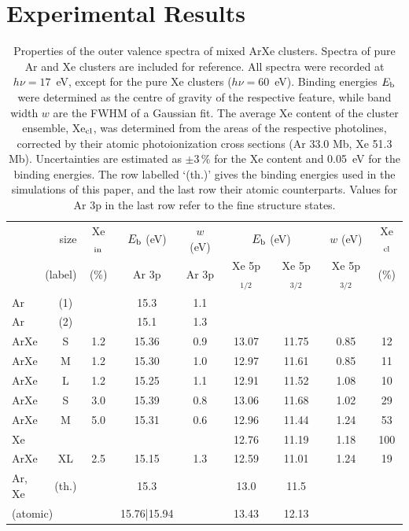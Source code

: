 \documentclass[journal=jpccck,manuscript=article]{achemso}
\def\EB{E_{\rm b}}
\begin{document}
\clearpage
\section{Experimental Results}
\label{sec:exp_results}
%
%
\begin{table}
\caption{Properties of the outer valence spectra of mixed ArXe clusters. 
Spectra of pure Ar and Xe clusters are included for reference. 
All spectra were recorded at $h\nu = 17$~eV, except for the pure Xe clusters ($h\nu = 60$~eV). 
Binding energies $\EB$ were determined as the centre of gravity of the respective feature, while band width $w$ are the FWHM of a Gaussian fit. 
The average Xe content of the cluster ensemble, Xe$_{\rm cl}$, was determined from the areas of the respective photolines, corrected by their atomic photoionization cross sections (Ar 33.0 Mb, Xe 51.3 Mb)\cite{samson2002}.
Uncertainties are estimated as $\pm$3\,\% for the Xe content and 0.05~eV for the binding energies. 
The row labelled `(th.)' gives the binding energies used in the simulations of this paper, and the last row their atomic counterparts. 
Values for Ar 3p in the last row refer to the fine structure states.
\label{tab:valence}}
\begin{tabular}{ l c c c c c c c c}
%
\toprule
 \multicolumn{2}{r}{size} &  Xe$_{\rm in}$& $\EB$ (eV)& $w$ (eV)& \multicolumn{2}{c}{$\EB$ (eV)}  & $w$ (eV) &  Xe$_{\rm cl}$ \\
%
 \multicolumn{2}{r}{(label)}&  (\%) & Ar 3p & Ar 3p & Xe 5p$_{1/2}$ &  Xe 5p$_{3/2}$ & Xe 5p$_{3/2}$  &  (\%) \\
\midrule
 Ar & (1) &&  15.3  &  1.1 & & & &  \\
 Ar & (2) &&  15.1  &  1.3 & & & &  \\
%
 ArXe & S &1.2 & 15.36 & 0.9 & 13.07 & 11.75 & 0.85 & 12\\
 ArXe & M &1.2 & 15.30 & 1.0 & 12.97 & 11.61 & 0.85 & 11\\
 ArXe & L &1.2 & 15.25 & 1.1 & 12.91 & 11.52 & 1.08 & 10\\
 ArXe & S &3.0 & 15.39 & 0.8 & 13.06 & 11.68 & 1.02 & 29\\
 ArXe & M &5.0 & 15.31 & 0.6 & 12.96 & 11.44 & 1.24 & 53\\
 Xe &  & & & & 12.76 & 11.19 & 1.18 & 100\\
%
\midrule
%
 ArXe & XL &2.5 & 15.15 & 1.3 & 12.59 & 11.01 & 1.24 & 19\\
%
\midrule
 Ar, Xe & (th.) && 15.3 && 13.0 & 11.5 &&\\
%
 \multicolumn{2}{l}{(atomic)\cite{velchev,sansonetti}} && 15.76|15.94 && 13.43 & 12.13 &&\\
%
\bottomrule
\end{tabular}
\end{table}
\end{document}
